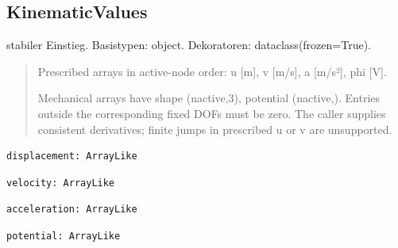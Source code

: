 \subsection{KinematicValues}
stabiler Einstieg.
Basistypen: object. Dekoratoren: dataclass(frozen=True).
\begin{quote}
Prescribed arrays in active-node order: u [m], v [m/s], a [m/s²], phi [V].\par Mechanical arrays have shape (nactive,3), potential (nactive,). Entries outside the corresponding fixed DOFs must be zero. The caller supplies consistent derivatives; finite jumps in prescribed u or v are unsupported.
\end{quote}
\begin{lstlisting}
displacement: ArrayLike
\end{lstlisting}
\begin{lstlisting}
velocity: ArrayLike
\end{lstlisting}
\begin{lstlisting}
acceleration: ArrayLike
\end{lstlisting}
\begin{lstlisting}
potential: ArrayLike
\end{lstlisting}
